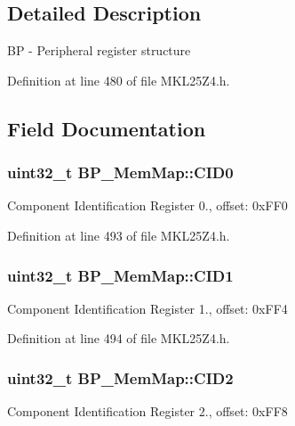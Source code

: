 \subsection{Detailed Description}
BP -\/ Peripheral register structure 

Definition at line 480 of file M\+K\+L25\+Z4.\+h.



\subsection{Field Documentation}
\subsubsection[{\texorpdfstring{C\+I\+D0}{CID0}}]{\setlength{\rightskip}{0pt plus 5cm}uint32\+\_\+t B\+P\+\_\+\+Mem\+Map\+::\+C\+I\+D0}\hypertarget{struct_b_p___mem_map_a533b8c0657ac258f340baaea96ecc00c}{}\label{struct_b_p___mem_map_a533b8c0657ac258f340baaea96ecc00c}
Component Identification Register 0., offset\+: 0x\+F\+F0 

Definition at line 493 of file M\+K\+L25\+Z4.\+h.

\subsubsection[{\texorpdfstring{C\+I\+D1}{CID1}}]{\setlength{\rightskip}{0pt plus 5cm}uint32\+\_\+t B\+P\+\_\+\+Mem\+Map\+::\+C\+I\+D1}\hypertarget{struct_b_p___mem_map_aecbf01d7c8fd4689e6ede5b9c12b3d94}{}\label{struct_b_p___mem_map_aecbf01d7c8fd4689e6ede5b9c12b3d94}
Component Identification Register 1., offset\+: 0x\+F\+F4 

Definition at line 494 of file M\+K\+L25\+Z4.\+h.

\subsubsection[{\texorpdfstring{C\+I\+D2}{CID2}}]{\setlength{\rightskip}{0pt plus 5cm}uint32\+\_\+t B\+P\+\_\+\+Mem\+Map\+::\+C\+I\+D2}\hypertarget{struct_b_p___mem_map_a3900abf0b057f791c7fe66a79862f837}{}\label{struct_b_p___mem_map_a3900abf0b057f791c7fe66a79862f837}
Component Identification Register 2., offset\+: 0x\+F\+F8 

